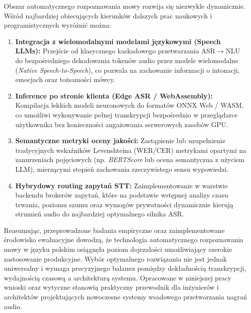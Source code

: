 Obszar automatycznego rozpoznawania mowy rozwija się niezwykle dynamicznie. Wśród najbardziej obiecujących kierunków dalszych prac naukowych i programistycznych wyróżnić można:
\begin{enumerate}
    \item \textbf{Integracja z wielomodalnymi modelami językowymi (Speech LLMs):} Przejście od klasycznego kaskadowego przetwarzania ASR$\to$NLU do bezpośredniego dekodowania tokenów audio przez modele wielomodalne (\textit{Native Speech-to-Speech}), co pozwala na zachowanie informacji o intonacji, emocjach oraz tożsamości mówcy.
    \item \textbf{Inference po stronie klienta (Edge ASR / WebAssembly):} Kompilacja lekkich modeli neuronowych do formatów ONNX Web / WASM, co umożliwi wykonywanie pełnej transkrypcji bezpośrednio w przeglądarce użytkownika bez konieczności angażowania serwerowych zasobów GPU.
    \item \textbf{Semantyczne metryki oceny jakości:} Zastąpienie lub uzupełnienie tradycyjnych wskaźników Levenshteina (WER/CER) metrykami opartymi na zanurzeniach pojęciowych (np. \textit{BERTScore} lub ocena semantyczna z użyciem LLM), mierzącymi stopień zachowania rzeczywistego sensu wypowiedzi.
    \item \textbf{Hybrydowy routing zapytań STT:} Zaimplementowanie w warstwie backendu brokerów zapytań, które na podstawie wstępnej analizy czasu trwania, poziomu szumu oraz wymogów prywatności dynamicznie kierują strumień audio do najbardziej optymalnego silnika ASR.
\end{enumerate}

\medskip

Reasumując, przeprowadzone badania empiryczne oraz zaimplementowane środowisko ewaluacyjne dowodzą, że technologia automatycznego rozpoznawania mowy w języku polskim osiągnęła poziom dojrzałości umożliwiający szerokie zastosowanie produkcyjne. Wybór optymalnego rozwiązania nie jest jednak uniwersalny i wymaga precyzyjnego balansu pomiędzy dokładnością transkrypcji, wydajnością czasową a architekturą systemu. Opracowane w niniejszej pracy wnioski oraz wytyczne stanowią praktyczny przewodnik dla inżynierów i architektów projektujących nowoczesne systemy wsadowego przetwarzania nagrań audio.